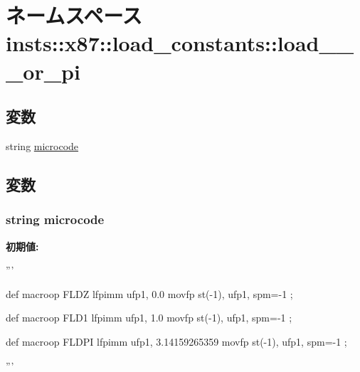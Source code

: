 \hypertarget{namespaceinsts_1_1x87_1_1load__constants_1_1load__0__1__or__pi}{
\section{ネームスペース insts::x87::load\_\-constants::load\_\_\_\-or\_\-pi}
\label{namespaceinsts_1_1x87_1_1load__constants_1_1load__0__1__or__pi}
}
\subsection*{変数}
\begin{DoxyCompactItemize}
\item 
string \hyperlink{namespaceinsts_1_1x87_1_1load__constants_1_1load__0__1__or__pi_a770f11a173e99389a8802f0107ed8f52}{microcode}
\end{DoxyCompactItemize}


\subsection{変数}
\hypertarget{namespaceinsts_1_1x87_1_1load__constants_1_1load__0__1__or__pi_a770f11a173e99389a8802f0107ed8f52}{
\subsubsection[{microcode}]{\setlength{\rightskip}{0pt plus 5cm}string {\bf microcode}}}
\label{namespaceinsts_1_1x87_1_1load__constants_1_1load__0__1__or__pi_a770f11a173e99389a8802f0107ed8f52}
{\bfseries 初期値:}
\begin{DoxyCode}
'''

def macroop FLDZ {
    lfpimm ufp1, 0.0
    movfp st(-1), ufp1, spm=-1
};

def macroop FLD1 {
    lfpimm ufp1, 1.0
    movfp st(-1), ufp1, spm=-1
};

def macroop FLDPI {
    lfpimm ufp1, 3.14159265359
    movfp st(-1), ufp1, spm=-1
};

'''
\end{DoxyCode}
